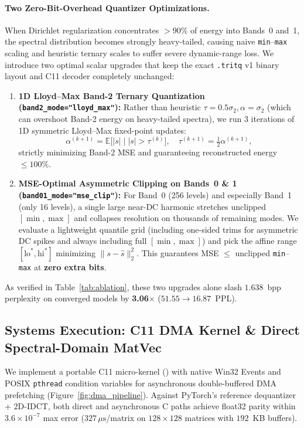 \documentclass[11pt,a4paper]{article}
\begin{document}
\paragraph{Two Zero-Bit-Overhead Quantizer Optimizations.}
When Dirichlet regularization concentrates $>90\%$ of energy into Bands~0 and~1, the spectral distribution becomes strongly heavy-tailed, causing naive \texttt{min}--\texttt{max} scaling and heuristic ternary scales to suffer severe dynamic-range loss. We introduce two optimal scalar upgrades that keep the exact \texttt{.tritq} v1 binary layout and C11 decoder completely unchanged:
\begin{enumerate}
    \item \textbf{1D Lloyd--Max Band-2 Ternary Quantization (\texttt{band2\_mode="lloyd\_max"}):} Rather than heuristic $\tau = 0.5\sigma_2, \alpha = \sigma_2$ (which can overshoot Band-2 energy on heavy-tailed spectra), we run 3 iterations of 1D symmetric Lloyd--Max fixed-point updates:
    \begin{equation}
        \alpha^{(k+1)} = \mathbb{E}\big[|s| \;\big|\; |s| > \tau^{(k)}\big], \quad \tau^{(k+1)} = \tfrac{1}{2}\alpha^{(k+1)},
    \end{equation}
    strictly minimizing Band-2 MSE and guaranteeing reconstructed energy $\le 100\%$.
    \item \textbf{MSE-Optimal Asymmetric Clipping on Bands~0 \& 1 (\texttt{band01\_mode="mse\_clip"}):} For Band~0 (256 levels) and especially Band~1 (only 16 levels), a single large near-DC harmonic stretches unclipped $[\min, \max]$ and collapses resolution on thousands of remaining modes. We evaluate a lightweight quantile grid (including one-sided trims for asymmetric DC spikes and always including full $[\min, \max]$) and pick the affine range $[\text{lo}^*, \text{hi}^*]$ minimizing $\|s - \hat{s}\|_2^2$. This guarantees MSE $\le$ unclipped \texttt{min}--\texttt{max} at \textbf{zero extra bits}.
\end{enumerate}
As verified in Table~\ref{tab:ablation}, these two upgrades alone slash $1.638$~bpp perplexity on converged models by \textbf{3.06$\times$} ($51.55 \to 16.87$~PPL).

\subsection{Systems Execution: C11 DMA Kernel \& Direct Spectral-Domain MatVec}
\label{sec:systems}
We implement a portable C11 micro-kernel () with native Win32 Events and POSIX \texttt{pthread} condition variables for asynchronous double-buffered DMA prefetching (Figure~\ref{fig:dma_pipeline}). Against PyTorch's reference dequantizer + 2D-IDCT, both direct and asynchronous C paths achieve float32 parity within $3.6 \times 10^{-7}$ max error ($327\,\mu\text{s}$/matrix on $128\times128$ matrices with $192$~KB buffers).
\end{document}
